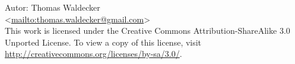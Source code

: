 \documentclass[10pt,DIV=50,landscape,pagesize,parskip=off]{scrartcl}
\begin{document}
\begin{multicols}{3}
\begin{framed}
{\small Autor: Thomas Waldecker\\
<\url{mailto:thomas.waldecker@gmail.com}>\\ This work is licensed under the
Creative Commons Attribution-ShareAlike 3.0 Unported License. To view a copy of
this license, visit \url{http://creativecommons.org/licenses/by-sa/3.0/}.}
\end{framed}

\end{multicols}
\end{document}
